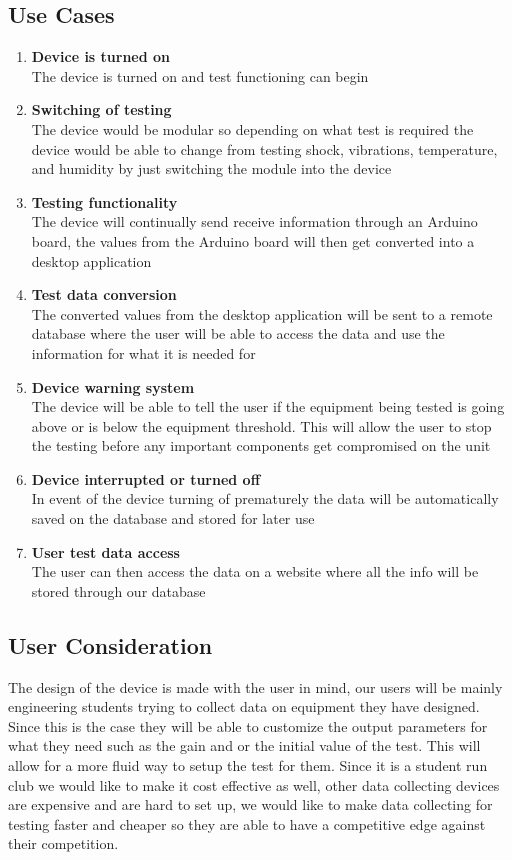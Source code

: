 \documentclass[12pt]{article}
\begin{document}
\subsection{Use Cases} 
\begin{enumerate}
  
  \item \textbf{Device is turned on}\\ The device is turned on and test functioning can begin \item \textbf{Switching of testing}\\ The device would be modular so depending on what test is required the device would be able to change from testing shock, vibrations, temperature, and humidity by just switching the module into the device \item \textbf{Testing functionality}\\ The device will continually send receive information through an Arduino board, the values from the Arduino board will then get converted into a desktop application \item \textbf{Test data conversion}\\ The converted values from the desktop application will be sent to a remote database where the user will be able to access the data and use the information for what it is needed for \item \textbf{Device warning system}\\ The device will be able to tell the user if the equipment being tested is going above or is below the equipment threshold. This will allow the user to stop the testing before any important components get compromised on the unit \item \textbf{Device interrupted or turned off}\\ In event of the device turning of prematurely the data will be automatically saved on the database and stored for later use \item \textbf{User test data access}\\ The user can then access the data on a website where all the info will be stored through our database


  
\end{enumerate}

\subsection{User Consideration}
The design of the device is made with the user in mind, our users will be mainly engineering students trying to collect data on equipment they have designed. Since this is the case they will be able to customize the output parameters for what they need such as the gain and or the initial value of the test. This will allow for a more fluid way to setup the test for them. Since it is a student run club we would like to make it cost effective as well, other data collecting devices are expensive and are hard to set up, we would like to make data collecting for testing faster and cheaper so they are able to have a competitive edge against their competition.
\end{document}
